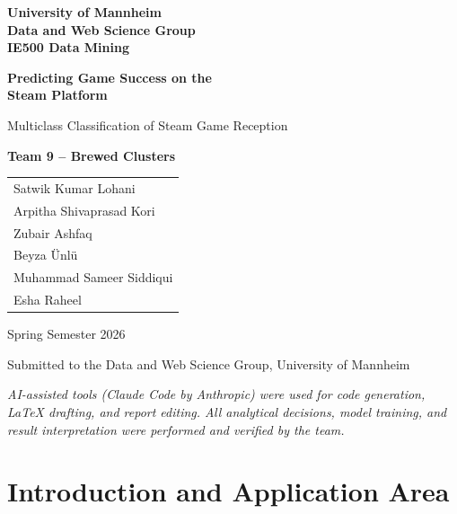 \documentclass[11pt, a4paper]{article}
\begin{document}
\begin{titlepage}
  \centering
  \vspace*{1.5cm}
  {\Large\bfseries University of Mannheim\\[0.3em]
   Data and Web Science Group\\[0.3em]
   IE500 Data Mining\par}
  \vspace{2cm}
  {\LARGE\bfseries Predicting Game Success on the\\[0.4em]
   Steam Platform\par}
  \vspace{0.8cm}
  {\large Multiclass Classification of Steam Game Reception\par}
  \vspace{2cm}
  {\large\bfseries Team 9 -- Brewed Clusters\par}
  \vspace{0.6cm}
  \begin{tabular}{l}
    Satwik Kumar Lohani      \\
    Arpitha Shivaprasad Kori \\
    Zubair Ashfaq            \\
    Beyza \"{U}nl\"{u}       \\
    Muhammad Sameer Siddiqui \\
    Esha Raheel              \\
  \end{tabular}
  \vspace{2cm}

  {\large Spring Semester 2026\par}
  \vspace{0.5cm}
  {\normalsize Submitted to the Data and Web Science Group,
               University of Mannheim\par}
  \vfill
  {\small\textit{AI-assisted tools (Claude Code by Anthropic) were used
  for code generation, LaTeX drafting, and report editing.
  All analytical decisions, model training, and result interpretation
  were performed and verified by the team.}}
\end{titlepage}

\tableofcontents
\newpage

\section{Introduction and Application Area}
\label{sec:intro}
\end{document}
